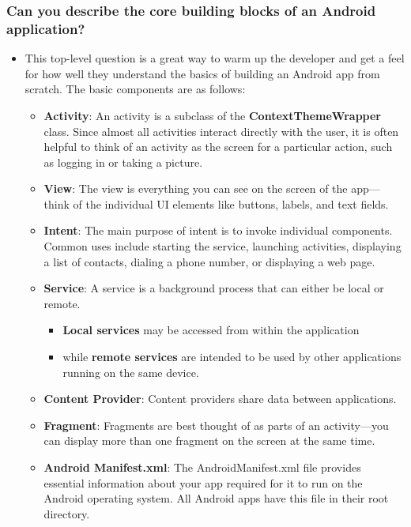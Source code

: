 \documentclass[9pt, b5paper]{article}
\begin{document}
\subsubsection{Can you describe the core building blocks of an Android application?}
\label{sec-1-1-2}
\begin{itemize}
\item This top-level question is a great way to warm up the developer and get a feel for how well they understand the basics of building an Android app from scratch. The basic components are as follows:
\begin{itemize}
\item \textbf{Activity}: An activity is a subclass of the \textbf{ContextThemeWrapper} class. Since almost all activities interact directly with the user, it is often helpful to think of an activity as the screen for a particular action, such as logging in or taking a picture.
\item \textbf{View}: The view is everything you can see on the screen of the app—think of the individual UI elements like buttons, labels, and text fields.
\item \textbf{Intent}: The main purpose of intent is to invoke individual components. Common uses include starting the service, launching activities, displaying a list of contacts, dialing a phone number, or displaying a web page.
\item \textbf{Service}: A service is a background process that can either be local or remote. 
\begin{itemize}
\item \textbf{Local services} may be accessed from within the application
\item while \textbf{remote services} are intended to be used by other applications running on the same device.
\end{itemize}
\item \textbf{Content Provider}: Content providers share data between applications.
\item \textbf{Fragment}: Fragments are best thought of as parts of an activity—you can display more than one fragment on the screen at the same time.
\item \textbf{Android Manifest.xml}: The AndroidManifest.xml file provides essential information about your app required for it to run on the Android operating system. All Android apps have this file in their root directory.
\end{itemize}
\end{itemize}
\end{document}
